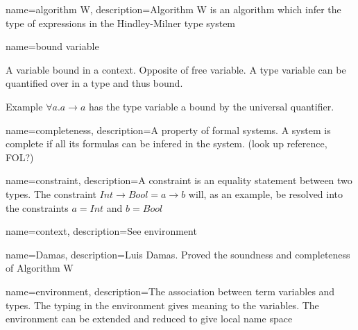 
%


%




{ name={algorithm W},
  description={Algorithm W is an algorithm which infer the type of expressions in the Hindley-Milner type system}
}

{ name={bound variable} }
{A variable bound in a context. Opposite of free variable. A type variable can be quantified over in a type and thus bound.

Example $\forall a . a \to a$ has the type variable a bound by the universal quantifier.}


{ name={completeness},
  description={A property of formal systems. A system is complete if all its formulas can be infered in the system.
(look up reference, FOL?)}
}

{ name={constraint},
  description={A constraint is an equality statement between two types. The constraint $Int \to Bool = a \to b$ will, as an example, be resolved into the constraints $a = Int$ and $b = Bool$}
}

{ name={context},
  description={See environment}
}

{ name={Damas},
  description={Luis Damas. Proved the soundness and completeness of Algorithm W}
} %

{ name={environment},
  description={The association between term variables and types. The typing in the environment gives meaning to the variables. The environment can be extended and reduced to give local name space}
}

